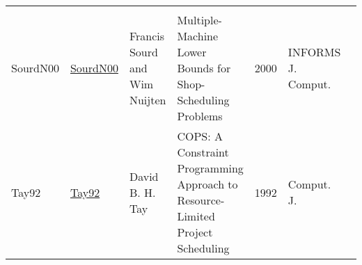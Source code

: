 {\begin{longtable}{llp{5cm}p{10cm}rp{3cm}l}
\cite{LorigeonBB02}\\SourdN00 & \href{https://doi.org/10.1287/ijoc.12.4.341.11881}{SourdN00} & Francis Sourd and Wim Nuijten & Multiple-Machine Lower Bounds for Shop-Scheduling Problems & 2000 & {INFORMS} J. Comput. & \cite{SourdN00}\\Tay92 & \href{}{Tay92} & David B. H. Tay & {COPS:} {A} Constraint Programming Approach to Resource-Limited Project Scheduling & 1992 & Comput. J. & \cite{Tay92}\\\end{longtable}
}

